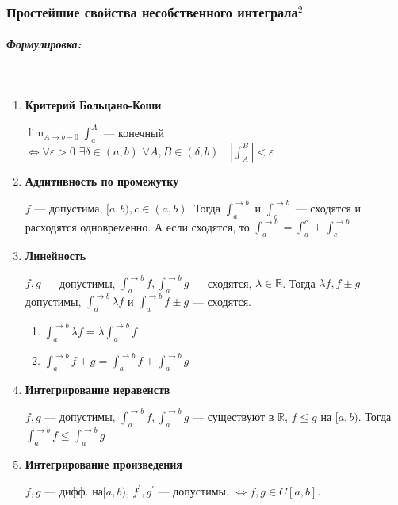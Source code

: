 \documentclass{article}
\def\dbl{\,\,}
\let\vanillasubparagraph\subparagraph
\renewcommand{\subparagraph}[1]{\vanillasubparagraph{#1}\mbox{}\\}
\begin{document}
\subsubsection{Простейшие свойства несобственного интеграла\texorpdfstring{$^2$}{}}

\subparagraph{Формулировка:}

\begin{enumerate}
    \item \textbf{Критерий Больцано-Коши}
    
    $\lim_{A \rightarrow b - 0}{\int_a^A}$ --- конечный $\Leftrightarrow \forall \varepsilon > 0 \dbl \exists \delta \in (a, b) \dbl \forall A, B \in (\delta, b) \quad \left|\int_A^B\right| < \varepsilon$
    
  \item \textbf{Аддитивность по промежутку}
    
    $f$ --- допустима, $[a, b), c \in (a, b)$. Тогда $\int_a^{\rightarrow b}$ и $\int_c^{\rightarrow b}$ --- сходятся и расходятся одновременно. А если сходятся, то $\int_a^{\rightarrow b} = \int_a^{c} + \int_c^{\rightarrow b}$
    
  \item \textbf{Линейность}
    
    $f, g$ --- допустимы, $\int_a^{\rightarrow b}f, \int_a^{\rightarrow b}g$ --- сходятся, $\lambda \in \mathbb{R}$. Тогда $\lambda f, f \pm g$ --- допустимы, $\int_a^{\rightarrow b}{\lambda f}$ и $\int_a^{\rightarrow b}{f \pm g}$ --- сходятся. 
    
    \begin{enumerate}
        \item $\int_a^{\rightarrow b}{\lambda f} = \lambda \int_a^{\rightarrow b}{f}$
        
         \item $\int_a^{\rightarrow b}{f \pm g} = \int_a^{\rightarrow b}{f} + \int_a^{\rightarrow b}{g}$
    \end{enumerate}
    \item \textbf{Интегрирование неравенств}
    
    $f, g$ --- допустимы, $\int_a^{\rightarrow b}f, \int_a^{\rightarrow b}g$ --- существуют в $\overline{\mathbb{R}}$, $f \le g$ на $[a, b)$. Тогда $\int_a^{\rightarrow b}f \le \int_a^{\rightarrow b}g$
    
    \item \textbf{Интегрирование произведения}
    
    $f, g$ --- дифф. на$[a, b)$, $f^\prime, g^\prime $ --- допустимы. $\Leftrightarrow f, g \in C[a, b]$.
    

\end{enumerate}
\end{document}

